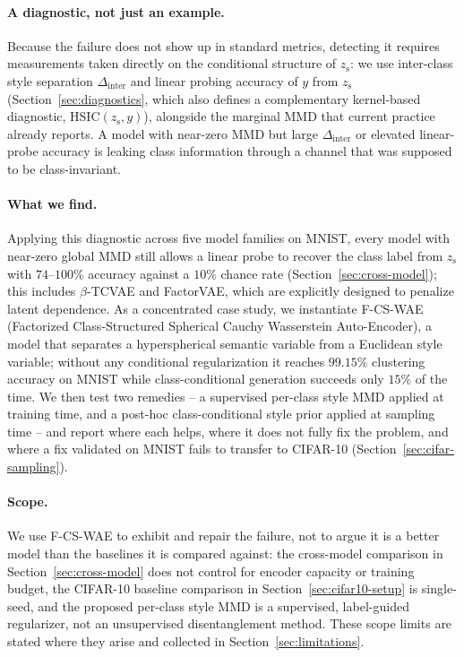 \documentclass[10pt,letterpaper]{article}
\newcommand{\ours}{F-CS-WAE}
\newcommand{\zs}{z_{\mathrm{s}}}
\begin{document}
\paragraph{A diagnostic, not just an example.}
Because the failure does not show up in standard metrics, detecting it
requires measurements taken directly on the conditional structure of $\zs$:
we use inter-class style separation $\Delta_{\mathrm{inter}}$ and linear
probing accuracy of $y$ from $\zs$ (Section~\ref{sec:diagnostics}, which
also defines a complementary kernel-based diagnostic, HSIC$(\zs,y)$),
alongside the marginal MMD that current practice already reports. A model
with near-zero MMD but large $\Delta_{\mathrm{inter}}$ or elevated
linear-probe accuracy is leaking class information through a channel that
was supposed to be class-invariant.

\paragraph{What we find.}
Applying this diagnostic across five model families on MNIST, every model
with near-zero global MMD still allows a linear probe to recover the class
label from $\zs$ with $74$--$100\%$ accuracy against a $10\%$ chance rate
(Section~\ref{sec:cross-model}); this includes $\beta$-TCVAE and FactorVAE,
which are explicitly designed to penalize latent dependence. As a
concentrated case study, we instantiate \ours{} (Factorized
Class-Structured Spherical Cauchy Wasserstein Auto-Encoder), a model that
separates a hyperspherical semantic variable from a Euclidean style
variable; without any conditional regularization it reaches $99.15\%$
clustering accuracy on MNIST while class-conditional generation succeeds
only $15\%$ of the time. We then test two remedies -- a supervised
per-class style MMD applied at training time, and a post-hoc
class-conditional style prior applied at sampling time -- and report where
each helps, where it does not fully fix the problem, and where a fix
validated on MNIST fails to transfer to CIFAR-10
(Section~\ref{sec:cifar-sampling}).

\paragraph{Scope.}
We use \ours{} to exhibit and repair the failure, not to argue it is a
better model than the baselines it is compared against: the cross-model
comparison in Section~\ref{sec:cross-model} does not control for encoder
capacity or training budget, the CIFAR-10 baseline comparison in
Section~\ref{sec:cifar10-setup} is single-seed, and the proposed per-class
style MMD is a supervised, label-guided regularizer, not an unsupervised
disentanglement method. These scope limits are stated where they arise and
collected in Section~\ref{sec:limitations}.
\end{document}

